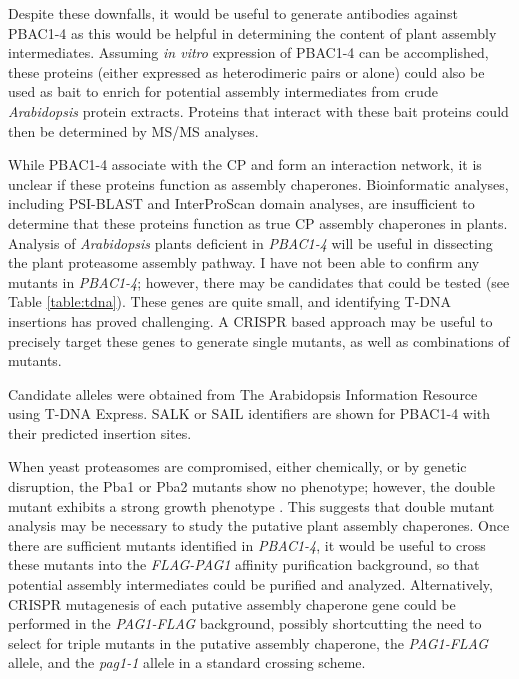 	Despite these downfalls, it would be useful to generate antibodies against PBAC1-4 as this would be helpful in determining the content of plant assembly intermediates. Assuming \textit{in vitro} expression of PBAC1-4 can be accomplished, these proteins (either expressed as heterodimeric pairs or alone) could also be used as bait to enrich for potential assembly intermediates from crude \textit{Arabidopsis} protein extracts. Proteins that interact with these bait proteins could then be determined by MS/MS analyses. 

	While PBAC1-4 associate with the CP and form an interaction network, it is unclear if these proteins function as assembly chaperones. Bioinformatic analyses, including PSI-BLAST and InterProScan domain analyses, are insufficient to determine that these proteins function as true CP assembly chaperones in plants. Analysis of \textit{Arabidopsis} plants deficient in \textit{PBAC1-4} will be useful in dissecting the plant proteasome assembly pathway.  I have not been able to confirm any mutants in \textit{PBAC1-4}; however, there may be candidates that could be tested (see Table \ref{table:tdna}). These genes are quite small, and identifying T-DNA insertions has proved challenging. A CRISPR based approach may be useful to precisely target these genes to generate single mutants, as well as combinations of mutants. 

\begin{table}[]
\centering
{}
{Candidate alleles were obtained from The Arabidopsis Information Resource \citep{berardini15} using T-DNA Express. SALK or SAIL identifiers are shown for PBAC1-4 with their predicted insertion sites.} 
\begingroup
\let\clearpage\relax
\scalebox{0.7}{

}
\endgroup
\label{table:tdna}
\end{table}

	
	When yeast proteasomes are compromised, either chemically, or by genetic disruption, the Pba1 or Pba2 mutants show no phenotype; however, the double mutant exhibits a strong growth phenotype \citep{kusmierczyk11}. This suggests that double mutant analysis may be necessary to study the putative plant assembly chaperones. Once there are sufficient mutants identified in \textit{PBAC1-4}, it would be useful to cross these mutants into the \textit{FLAG-PAG1} affinity purification background, so that potential assembly intermediates could be purified and analyzed. Alternatively, CRISPR mutagenesis of each putative assembly chaperone gene could be performed in the \textit{PAG1-FLAG} background, possibly shortcutting the need to select for triple mutants in the putative assembly chaperone, the \textit{PAG1-FLAG} allele, and the \textit{pag1-1} allele in a standard crossing scheme. 

